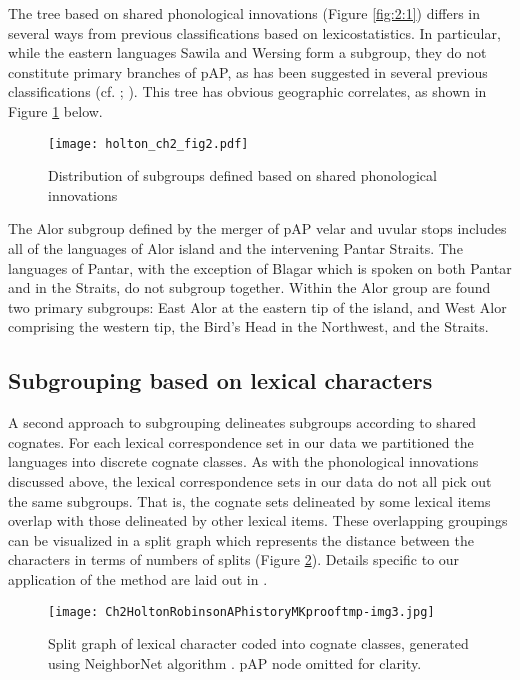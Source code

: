 The tree based on shared phonological innovations (Figure \ref{fig:2:1}) differs in several ways from previous classifications based on lexicostatistics. In particular, while the eastern languages Sawila and Wersing form a subgroup, they do not constitute primary branches of pAP, as has been suggested in several previous classifications (cf. \citealt{Wurm1982}; \citealt{Lewis2009}). This tree has obvious geographic correlates, as shown in Figure \ref{fig:2:2} below. 

\begin{figure}
\texttt{[image: holton\_ch2\_fig2.pdf]}
\caption{Distribution of subgroups defined based on shared phonological innovations}
\label{fig:2:2}
\end{figure}

The Alor subgroup defined by the merger of pAP velar and uvular stops includes all of the languages of Alor island and the intervening Pantar Straits. The languages of Pantar, with the exception of Blagar which is spoken on both Pantar and in the Straits, do not subgroup together. Within the Alor group are found two primary subgroups: East Alor at the eastern tip of the island, and West Alor comprising the western tip, the Bird's Head in the Northwest, and the Straits.

\subsection{ Subgrouping based on lexical characters}
A second approach to subgrouping delineates subgroups according to shared cognates. For each lexical correspondence set in our data we partitioned the languages into discrete cognate classes. As with the phonological innovations discussed above, the lexical correspondence sets in our data do not all pick out the same subgroups. That is, the cognate sets delineated by some lexical items overlap with those delineated by other lexical items. These overlapping groupings can be visualized in a split graph which represents the distance between the characters in terms of numbers of splits (Figure \ref{fig:2:split_graph}). Details specific to our application of the method are laid out in \citet{RobinsonEtAl2012internal}.

\begin{figure}\centering
\texttt{[image: Ch2HoltonRobinsonAPhistoryMKprooftmp-img3.jpg]}
\caption{Split graph of lexical character coded into cognate classes, generated using NeighborNet algorithm  \citep{HusonEtAl2006}. pAP node omitted for clarity.}
\label{fig:2:split_graph}
\end{figure}

